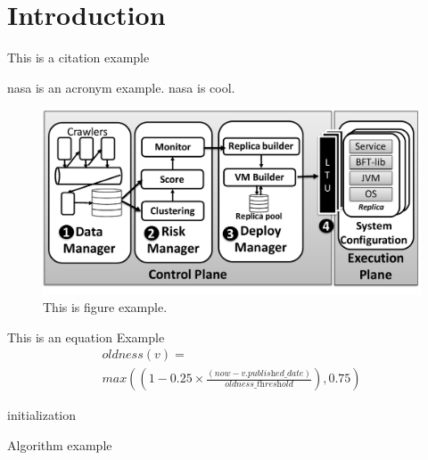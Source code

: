 \chapter{Introduction}
\label{chap:introduction}
\lipsum[1-3]


This is a citation example~\cite{Garcia:2018}

\gls{nasa} is an acronym example. \gls{nasa} is cool.

\begin{figure}[!t]
\begin{center}
\includegraphics[width=\columnwidth]{images/figure_example.pdf}
\caption{This is figure example.}
\label{fig:overview}
\end{center}
\end{figure}



This is an equation Example
\begin{equation} 
\begin{split}
\textit{oldness}(v)=\\\textit{max}\left((1-0.25\times\frac{(\textit{now}-v.\textit{published\_date})}{\textit{oldness\_threshold}}), 0.75\right)
\label{eq:oldness}
\end{split}
\end{equation}

\begin{algorithm}[H]
\SetAlgoLined
{}
 initialization\;
 \caption{Algorithm example}
\end{algorithm}



